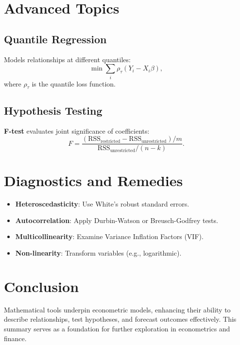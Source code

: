 \documentclass{article}
\begin{document}
\section{Advanced Topics}
\subsection{Quantile Regression}
Models relationships at different quantiles:
\begin{equation}
    \min \sum_{i} \rho_{\tau}(Y_i - X_i\beta),
\end{equation}
where $\rho_{\tau}$ is the quantile loss function.

\subsection{Hypothesis Testing}
\textbf{F-test} evaluates joint significance of coefficients:
\begin{equation}
    F = \frac{(\text{RSS}_{\text{restricted}} - \text{RSS}_{\text{unrestricted}})/m}{\text{RSS}_{\text{unrestricted}}/(n - k)}.
\end{equation}

\section{Diagnostics and Remedies}
\begin{itemize}
    \item \textbf{Heteroscedasticity}: Use White's robust standard errors.
    \item \textbf{Autocorrelation}: Apply Durbin-Watson or Breusch-Godfrey tests.
    \item \textbf{Multicollinearity}: Examine Variance Inflation Factors (VIF).
    \item \textbf{Non-linearity}: Transform variables (e.g., logarithmic).
\end{itemize}

\section{Conclusion}
Mathematical tools underpin econometric models, enhancing their ability to describe relationships, test hypotheses, and forecast outcomes effectively. This summary serves as a foundation for further exploration in econometrics and finance.
\end{document}

